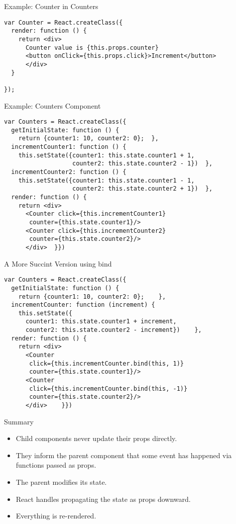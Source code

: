 \documentclass[presentation]{beamer}
\begin{document}
\begin{frame}[fragile,label={sec:orgheadline5}]{Example: Counter in Counters}
 \begin{verbatim}
var Counter = React.createClass({
  render: function () {
    return <div>
      Counter value is {this.props.counter}
      <button onClick={this.props.click}>Increment</button>
      </div>
  }

});
\end{verbatim}
\end{frame}

\begin{frame}[fragile,label={sec:orgheadline6}]{Example: Counters Component}
 \begin{verbatim}
var Counters = React.createClass({
  getInitialState: function () {
    return {counter1: 10, counter2: 0};  },
  incrementCounter1: function () {
    this.setState({counter1: this.state.counter1 + 1,
                   counter2: this.state.counter2 - 1})  },
  incrementCounter2: function () {
    this.setState({counter1: this.state.counter1 - 1,
                   counter2: this.state.counter2 + 1})  },
  render: function () {
    return <div>
      <Counter click={this.incrementCounter1}
       counter={this.state.counter1}/>
      <Counter click={this.incrementCounter2}
       counter={this.state.counter2}/>
      </div>  }})
\end{verbatim}
\end{frame}

\begin{frame}[fragile,label={sec:orgheadline7}]{A More Succint Version using bind}
 \begin{verbatim}
var Counters = React.createClass({
  getInitialState: function () {
    return {counter1: 10, counter2: 0};    },
  incrementCounter: function (increment) {
    this.setState({
      counter1: this.state.counter1 + increment,
      counter2: this.state.counter2 - increment})    },
  render: function () {
    return <div>
      <Counter
       click={this.incrementCounter.bind(this, 1)}
       counter={this.state.counter1}/>
      <Counter
       click={this.incrementCounter.bind(this, -1)}
       counter={this.state.counter2}/>
      </div>    }})
\end{verbatim}
\end{frame}


\begin{frame}[label={sec:orgheadline8}]{Summary}
\begin{itemize}
\item Child components never update their props directly.
\item They inform the parent component that some event has happened via functions
passed as props.
\item The parent modifies its state.
\item React handles propagating the state as props downward.
\item Everything is re-rendered.
\end{itemize}
\end{frame}
\end{document}
